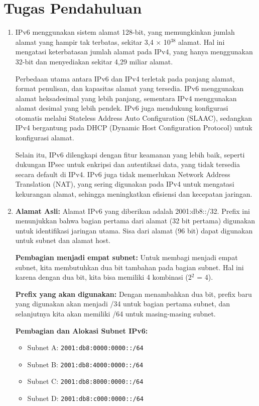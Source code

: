 \section{Tugas Pendahuluan}
\begin{enumerate}
    \item IPv6 menggunakan sistem alamat 128-bit, yang memungkinkan jumlah alamat yang hampir tak terbatas, sekitar 3,4 $\times$ 10$^{38}$ alamat. Hal ini mengatasi keterbatasan jumlah alamat pada IPv4, yang hanya menggunakan 32-bit dan menyediakan sekitar 4,29 miliar alamat.
    
    Perbedaan utama antara IPv6 dan IPv4 terletak pada panjang alamat, format penulisan, dan kapasitas alamat yang tersedia. IPv6 menggunakan alamat heksadesimal yang lebih panjang, sementara IPv4 menggunakan alamat desimal yang lebih pendek. IPv6 juga mendukung konfigurasi otomatis melalui Stateless Address Auto Configuration (SLAAC), sedangkan IPv4 bergantung pada DHCP (Dynamic Host Configuration Protocol) untuk konfigurasi alamat.
    
    Selain itu, IPv6 dilengkapi dengan fitur keamanan yang lebih baik, seperti dukungan IPsec untuk enkripsi dan autentikasi data, yang tidak tersedia secara default di IPv4. IPv6 juga tidak memerlukan Network Address Translation (NAT), yang sering digunakan pada IPv4 untuk mengatasi kekurangan alamat, sehingga meningkatkan efisiensi dan kecepatan jaringan.

    \item 
    \textbf{Alamat Asli:}
    Alamat IPv6 yang diberikan adalah 2001:db8::/32. Prefix ini menunjukkan bahwa bagian pertama dari alamat (32 bit pertama) digunakan untuk identifikasi jaringan utama. Sisa dari alamat (96 bit) dapat digunakan untuk subnet dan alamat host.

    \textbf{Pembagian menjadi empat subnet:}
    Untuk membagi menjadi empat subnet, kita membutuhkan dua bit tambahan pada bagian subnet. Hal ini karena dengan dua bit, kita bisa memiliki 4 kombinasi (2$^2$ = 4).

    \textbf{Prefix yang akan digunakan:}
    Dengan menambahkan dua bit, prefix baru yang digunakan akan menjadi /34 untuk bagian pertama subnet, dan selanjutnya kita akan memiliki /64 untuk masing-masing subnet.

    \textbf{Pembagian dan Alokasi Subnet IPv6:}
    \begin{itemize}
        \item Subnet A: \texttt{2001:db8:0000:0000::/64}
        \item Subnet B: \texttt{2001:db8:4000:0000::/64}
        \item Subnet C: \texttt{2001:db8:8000:0000::/64}
        \item Subnet D: \texttt{2001:db8:c000:0000::/64}
    \end{itemize}


\end{enumerate}
